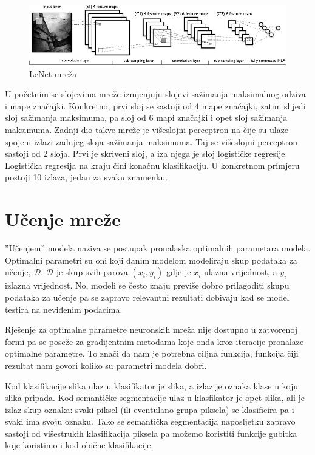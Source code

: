 \documentclass[times, utf8, diplomski, numeric]{fer}
\begin{document}
\begin{figure}[htb]
\centering
\includegraphics[width=\textwidth]{imgs/mylenet.png}
\caption{LeNet mreža}
\label{fig:lenet5}
\end{figure}

U početnim se slojevima mreže izmjenjuju slojevi sažimanja maksimalnog odziva i mape značajki. Konkretno, prvi sloj se sastoji od 4 mape značajki, zatim slijedi sloj sažimanja maksimuma, pa sloj od 6 mapi značajki i opet sloj sažimanja maksimuma. Zadnji dio takve mreže je višeslojni perceptron na čije su ulaze spojeni izlazi zadnjeg sloja sažimanja maksimuma. Taj se višeslojni perceptron sastoji od 2 sloja. Prvi je skriveni sloj, a iza njega je sloj logističke regresije. Logistička regresija na kraju čini konačnu klasifikaciju. U konkretnom primjeru postoji 10 izlaza, jedan za svaku znamenku.

\chapter{Učenje mreže}

''Učenjem'' modela naziva se postupak pronalaska optimalnih parametara modela. Optimalni parametri su oni koji danim modelom modeliraju skup podataka za učenje, $\mathcal{D}$. $\mathcal{D}$ je skup svih parova $(x_i, y_i)$ gdje je $x_i$ ulazna vrijednost, a $y_i$ izlazna vrijednost. No, modeli se često znaju previše dobro prilagoditi skupu podataka za učenje pa se zapravo relevantni rezultati dobivaju kad se model testira na neviđenim podacima.

Rješenje za optimalne parametre neuronskih mreža nije dostupno u zatvorenoj formi pa se poseže za gradijentnim metodama koje onda kroz iteracije pronalaze optimalne parametre. To znači da nam je potrebna ciljna funkcija, funkcija čiji rezultat nam govori koliko su parametri modela dobri.

Kod klasifikacije slika ulaz u klasifikator je slika, a izlaz je oznaka klase u koju slika pripada. Kod semantičke segmentacije ulaz u klasfikator je opet slika, ali je izlaz skup oznaka: svaki piksel (ili eventulano grupa piksela) se klasificira pa i svaki ima svoju oznaku. Tako se semantička segmentacija naposljetku zapravo sastoji od višestrukih klasifikacija piksela pa možemo koristiti funkcije gubitka koje koristimo i kod obične klasifikacije.
\end{document}
